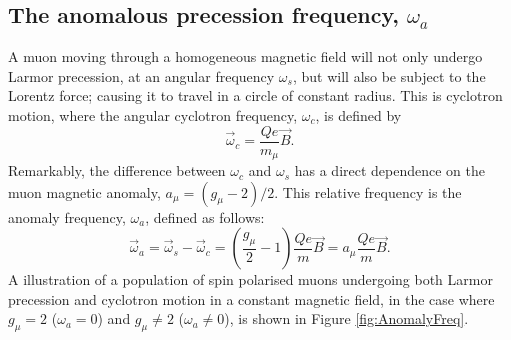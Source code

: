 
\subsection{The anomalous precession frequency, $\omega_{a}$}

A muon moving through a homogeneous magnetic field will not only undergo Larmor precession, at an angular frequency $\omega_{s}$, but will also be subject to the Lorentz force; causing it to travel in a circle of constant radius. This is cyclotron motion, where the angular cyclotron frequency, $\omega_{c}$, is defined by 
%
\begin{equation}
  \vec{\omega}_{c}=\frac{Qe}{m_{\mu}}\vec{B}.
  \label{eqn:Cyclotron}
\end{equation}
%
Remarkably, the difference between $\omega_{c}$ and $\omega_{s}$ has a direct dependence on the muon magnetic anomaly, $a_{\mu}=(g_{\mu}-2)/2$. This relative frequency is the anomaly frequency, $\omega_{a}$, defined as follows:
%
\begin{equation}
  \vec{\omega}_{a}=\vec{\omega}_{s}-\vec{\omega}_{c}=\left( \frac{g_{\mu}}{2}-1 \right)\frac{Qe}{m}\vec{B}=a_{\mu}\frac{Qe}{m}\vec{B}.
  \label{eqn:omega_a}
\end{equation}
%
A illustration of a population of spin polarised muons undergoing both Larmor precession and cyclotron motion in a constant magnetic field, in the case where $g_{\mu}=2$ ($\omega_{a}=0$) and $g_{\mu}\neq2$ ($\omega_{a}\neq0$), is shown in Figure \ref{fig:AnomalyFreq}. 


